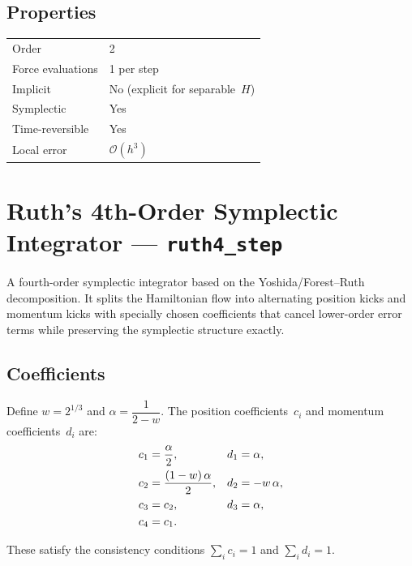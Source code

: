 \documentclass[11pt,a4paper]{article}
\newcommand{\bigO}{\mathcal{O}}
\begin{document}
\subsection{Properties}
\begin{center}
\begin{tabular}{ll}
  \hline
  Order             & 2 \\
  Force evaluations & 1 per step \\
  Implicit          & No (explicit for separable~$H$) \\
  Symplectic        & Yes \\
  Time-reversible   & Yes \\
  Local error       & $\bigO(h^3)$ \\
  \hline
\end{tabular}
\end{center}

\section{Ruth's 4th-Order Symplectic Integrator --- \texttt{ruth4\_step}}
\label{sec:ruth4}

A fourth-order symplectic integrator based on the Yoshida/Forest--Ruth
decomposition. It splits the Hamiltonian flow into alternating position kicks
and momentum kicks with specially chosen coefficients that cancel lower-order
error terms while preserving the symplectic structure exactly.

\subsection{Coefficients}

Define $w = 2^{1/3}$ and $\alpha = \dfrac{1}{2 - w}$. The position
coefficients~$c_i$ and momentum coefficients~$d_i$ are:
\begin{align}
  c_1 &= \frac{\alpha}{2},        & d_1 &= \alpha, \notag\\
  c_2 &= \frac{(1-w)\,\alpha}{2}, & d_2 &= -w\,\alpha, \notag\\
  c_3 &= c_2,                     & d_3 &= \alpha, \notag\\
  c_4 &= c_1.                     &     &
  \label{eq:ruth-coeff}
\end{align}

These satisfy the consistency conditions $\sum_i c_i = 1$ and $\sum_i d_i = 1$.
\end{document}
